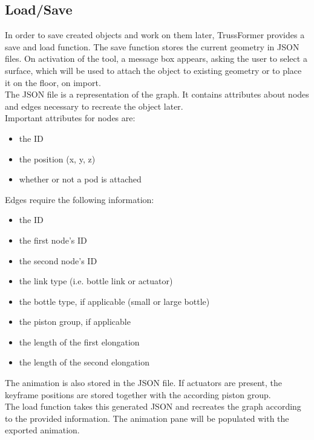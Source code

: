 \subsection{Load/Save}
In order to save created objects and work on them later, TrussFormer provides a save and load function. The save function stores the current geometry in \ac{JSON} files. On activation of the tool, a message box appears, asking the user to select a surface, which will be used to attach the object to existing geometry or to place it on the floor, on import.\\
The JSON file is a representation of the graph. It contains attributes about nodes and edges necessary to recreate the object later.\\
Important attributes for nodes are:
\begin{itemize}
  \item the ID
  \item the position (x, y, z)
  \item whether or not a pod is attached
\end{itemize}
Edges require the following information:
\begin{itemize}
  \item the ID
  \item the first node's ID
  \item the second node's ID
  \item the link type (i.e. bottle link or actuator)
  \item the bottle type, if applicable (small or large bottle)
  \item the piston group, if applicable
  \item the length of the first elongation
  \item the length of the second elongation
\end{itemize}
The animation is also stored in the JSON file. If actuators are present, the keyframe positions are stored together with the according piston group.\\
The load function takes this generated JSON and recreates the graph according to the provided information. The animation pane will be populated with the exported animation.

